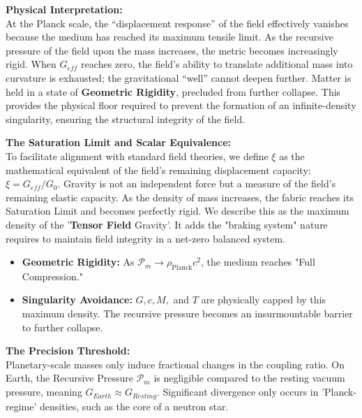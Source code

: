 \documentclass{article}
\begin{document}
\textbf{Physical Interpretation:} \\
At the Planck scale, the ``displacement response'' of the field effectively vanishes because the medium has reached its maximum tensile limit. As the recursive pressure of the field upon the mass increases, the metric becomes increasingly rigid. When $G_{eff}$ reaches zero, the field's ability to translate additional mass into curvature is exhausted; the gravitational ``well'' cannot deepen further. Matter is held in a state of \textbf{Geometric Rigidity}, precluded from further collapse. This provides the physical floor required to prevent the formation of an infinite-density singularity, ensuring the structural integrity of the field.

\textbf{The Saturation Limit and Scalar Equivalence:} \\
To facilitate alignment with standard field theories, we define $\xi$ as the mathematical equivalent of the field's remaining displacement capacity: $\xi = G_{eff}/G_0$. Gravity is not an independent force but a measure of the field's remaining elastic capacity. As the density of mass increases, the fabric reaches its Saturation Limit and becomes perfectly rigid. We describe this as the maximum density of the '\textbf{Tensor Field} Gravity'. It adds the "braking system" nature requires to maintain field integrity in a net-zero balanced system.

\begin{itemize}
    \item \textbf{Geometric Rigidity:} As $\mathcal{P}_m \to \rho_{\text{Planck}}c^2$, the medium reaches "Full Compression."
    \item \textbf{Singularity Avoidance:} $G, c, M,$ and $T$ are physically capped by this maximum density. The recursive pressure becomes an insurmountable barrier to further collapse.
\end{itemize}

\textbf{The Precision Threshold:}\\
Planetary-scale masses only induce fractional changes in the coupling ratio. On Earth, the Recursive Pressure $\mathcal{P}_m$ is negligible compared to the resting vacuum pressure, meaning $G_{Earth} \approx G_{Resting}$. Significant divergence only occurs in 'Planck-regime' densities, such as the core of a neutron star.

\end{document}
